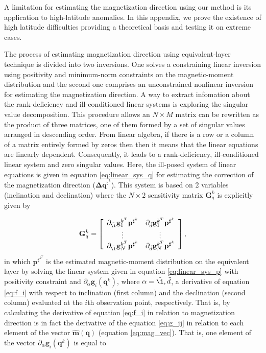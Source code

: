 
A limitation for estimating the magnetization direction using our method is its application to high-latitude anomalies. In this appendix, we prove the existence of high latitude difficulties providing a theoretical basis and testing it on extreme cases.

The process of estimating magnetization direction using equivalent-layer technique is divided into two inversions. One solves a constraining linear inversion using positivity and minimum-norm constraints on the magnetic-moment distribution and the second one comprises an unconstrained nonlinear inversion for estimating the magnetization direction. A way to extract infomation about the rank-deficiency and ill-conditioned linear systems is exploring the singular value decomposition. This procedure allows an $N \times M$ matrix can be rewritten as the product of three matrices, one of them formed by a set of singular values arranged in descending order. From linear algebra, if there is a row or a column of a matrix entirely formed by zeros then then it means that the linear equations are linearly dependent. Consequently, it leads to a rank-deficiency, ill-conditioned linear system and zero singular values. Here, the ill-posed system of linear equations is given in equation \ref{eq:linear_sys_q} for estimating the correction of the magnetization direction ($\mathbf{\Delta q}^{\sharp^k}$). This system is based on 2 variables (inclination and declination) where the $N \times 2$ sensitivity matrix $\mathbf{G}_{q}^{k}$ is explicitly given by

\begin{equation}
\mathbf{G}_{q}^{k} =
\left[ \begin{array}{cc}
\partial_{\tilde{\i}} \mathbf{g}_{1}^{k^T} \mathbf{p}^{\sharp^{k}}   & \partial_{\tilde{d}} \mathbf{g}_{1}^{k^T} \mathbf{p}^{\sharp^{k}} \\
\vdots & \vdots  \\
\partial_{\tilde{\i}} \mathbf{g}_{N}^{k^T} \mathbf{p}^{\sharp^{k}}   & \partial_{\tilde{d}} \mathbf{g}_{N}^{k^T} \mathbf{p}^{\sharp^{k}} 
\end{array} \right] ,
\label{eq:gp}
\end{equation}
in which $\mathbf{p}^{\sharp^{k^T}}$ is the estimated magnetic-moment distribution on the equivalent layer by solving the linear system given in equation \ref{eq:linear_sys_p} with positivity constraint and $\partial_{\alpha}\mathbf{g}_{i} (\mathbf{q}^k)$, where $\alpha= \tilde{\i}, \tilde{d}$, a derivative of equation \ref{eq:f_i} with respect to inclination (first column) and the declination (second column) evaluated at the $i$th observation point, respectively. That is, by calculating the derivative of equation \ref{eq:f_i} in relation to magnetization direction is in fact the derivative of the equation \ref{eq:g_ij} in relation to each element of the vector $\hat{\mathbf{m}}(\mathbf{q})$ (equation \ref{eq:mag_vec}). That is, one element of the vector $\partial_{\alpha}\mathbf{g}_{i} (\mathbf{q}^k)$ is equal to 



